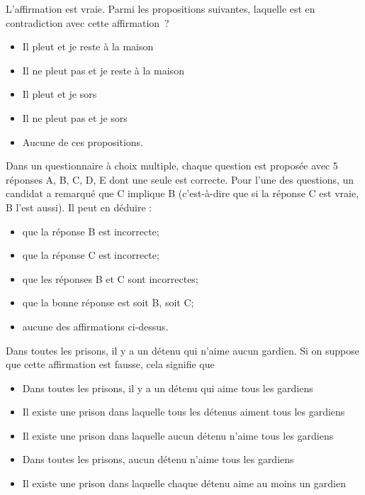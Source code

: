 \documentclass[12pt,french,oneside,a4paper]{memoir} %
\begin{document}
\begin{exo}
L'affirmation \fg{} est vraie. Parmi les propositions suivantes, laquelle est en contradiction avec cette affirmation~?

\begin{itemize}
\item \og Il pleut et je reste à la maison\fg{}
\item \og Il ne pleut pas et je reste à la maison\fg{}
\item \og Il pleut et je sors\fg{}
\item \og Il ne pleut pas et je sors\fg{}
\item Aucune de ces propositions.
\end{itemize}
\end{exo}

\begin{exo}
Dans un questionnaire à choix multiple, chaque question est
proposée avec 5 réponses A, B, C, D, E dont une seule est correcte. Pour
l'une des questions, un candidat a remarqué que C implique B
(c'est-à-dire que si la réponse C est vraie, B l'est aussi). Il peut en
déduire :

\begin{itemize}
\item que la réponse B est incorrecte;
\item que la réponse C est incorrecte;
\item que les réponses B et C sont incorrectes;
\item que la bonne réponse est soit B, soit C;
\item aucune des affirmations ci-dessus.
\end{itemize}
\end{exo}

\begin{exo}
\og Dans toutes les prisons, il y a un détenu qui n'aime aucun gardien\fg{}. Si on
suppose que cette affirmation est fausse, cela signifie que

\begin{itemize}
\item Dans toutes les prisons, il y a un détenu qui aime tous les gardiens
\item Il existe une prison dans laquelle tous les détenus aiment tous les gardiens
\item Il existe une prison dans laquelle aucun détenu n'aime tous les gardiens
\item Dans toutes les prisons, aucun détenu n'aime tous les gardiens
\item Il existe une prison dans laquelle chaque détenu aime au moins un gardien
\end{itemize}
\end{exo}
\end{document}
